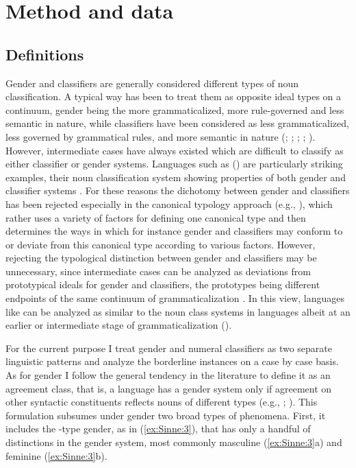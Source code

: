 \documentclass[output=collectionpaper]{langsci/langscibook}
\begin{document}
\section{Method and data}
\label{sec:Sinne:3}

\subsection{ Definitions}
\label{sec:Sinne:3.1}

Gender and classifiers are generally considered different types of noun classification. A typical way has been to treat them as opposite ideal types on a continuum, gender being the more grammaticalized, more rule-governed and less semantic in nature, while classifiers have been considered as less grammaticalized, less governed by grammatical rules, and more semantic in nature (\citealt{Dixon1982}; \citealt{Serzisko1982}; \citealt{Corbett1991}; \citealt{Aikhenvald2000}; \citealt{Passer2016b}). However, intermediate cases have always existed which are difficult to classify as either classifier or gender systems. Languages such as  () are particularly striking examples, their noun classification system showing properties of both gender and classifier systems \citep{Seifart2005}. For these reasons the dichotomy between gender and classifiers has been rejected especially in the canonical typology approach (e.g., \citealt{Corbett2016}), which rather uses a variety of factors for defining one canonical type and then determines the ways in which for instance gender and classifiers may conform to or deviate from this canonical type according to various factors. However, rejecting the typological distinction between gender and classifiers may be unnecessary, since intermediate cases can be analyzed as deviations from prototypical ideals for gender and classifiers, the prototypes being different endpoints of the same continuum of grammaticalization \citep{Passer2016b}. In this view, languages like  can be analyzed as similar to the noun class systems in  languages albeit at an earlier or intermediate stage of grammaticalization (\citealt{Grinevald2004}).

For the current purpose I treat gender and numeral classifiers as two separate linguistic patterns and analyze the borderline instances on a case by case basis. As for gender I follow the general tendency in the literature to define it as an agreement class, that is, a language has a gender system only if agreement on other syntactic constituents reflects nouns of different types (e.g., \citealt[4--5]{Corbett1991}; \citealt[124--125]{Nichols1992}). This formulation subsumes under gender two broad types of phenomena. First, it includes the -type gender, as in (\ref{ex:Sinne:3}), that has only a handful of distinctions in the gender system, most commonly masculine (\ref{ex:Sinne:3}a) and feminine (\ref{ex:Sinne:3}b).
\end{document}

